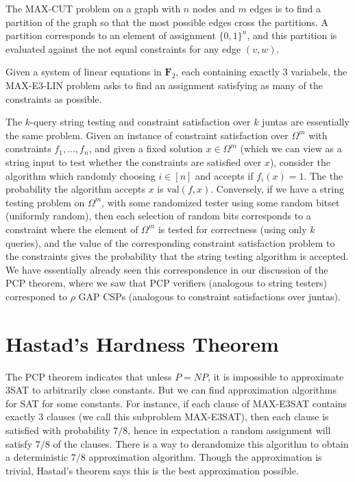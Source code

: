 \begin{example}
    The MAX-CUT problem on a graph with $n$ nodes and $m$ edges is to find a partition of the graph so that the most possible edges cross the partitions. A partition corresponds to an element of assignment $\{ 0, 1 \}^n$, and this partition is evaluated against the not equal constraints for any edge $(v,w)$.
\end{example}

\begin{example}
    Given a system of linear equations in $\mathbf{F}_2$, each containing exactly 3 variabels, the MAX-E3-LIN problem asks to find an assignment satisfying as many of the constraints as possible.
\end{example}

The $k$-query string testing and constraint satisfaction over $k$ juntas are essentially the same problem. Given an instance of constraint satisfaction over $\Omega^m$ with constraints $f_1, \dots, f_n$, and given a fixed solution $x \in \Omega^m$ (which we can view as a string input to test whether the constraints are satisfied over $x$), consider the algorithm which randomly choosing $i \in [n]$ and accepts if $f_i(x) = 1$. The the probability the algorithm accepts $x$ is $\text{val}(f, x)$. Conversely, if we have a string testing problem on $\Omega^m$, with some randomized tester using some random bitset (uniformly random), then each selection of random bits corresponds to a constraint where the element of $\Omega^m$ is tested for correctness (using only $k$ queries), and the value of the corresponding constraint satisfaction problem to the constraints gives the probability that the string testing algorithm is accepted. We have essentially already seen this correspondence in our discussion of the PCP theorem, where we saw that PCP verifiers (analogous to string testers) corresponed to $\rho$ GAP CSPs (analogous to constraint satisfactions over juntas).

\section{Hastad's Hardness Theorem}

The PCP theorem indicates that unless $P = NP$, it is impossible to approximate 3SAT to arbitrarily close constants. But we can find approximation algorithms for SAT for some constants. For instance, if each clause of MAX-E3SAT contains exactly 3 clauses (we call this subproblem MAX-E3SAT), then each clause is satisfied with probability $7/8$, hence in expectation a random assignment will satisfy $7/8$ of the clauses. There is a way to derandomize this algorithm to obtain a deterministic $7/8$ approximation algorithm. Though the approximation is trivial, Hastad's theorem says this is the best approximation possible.

